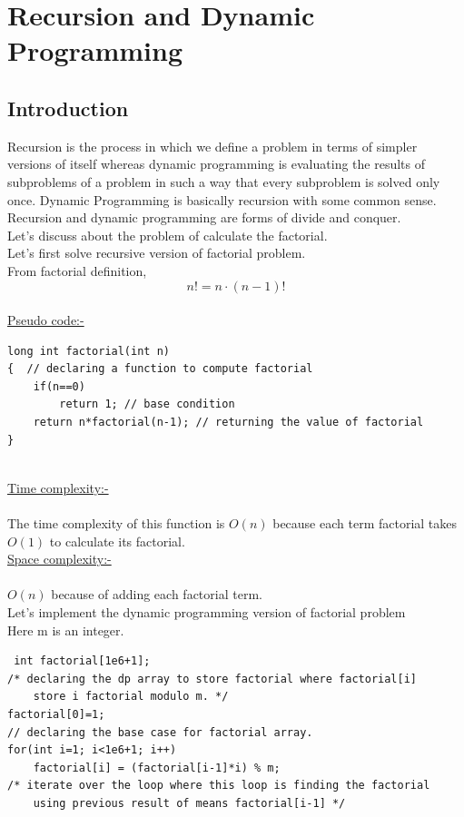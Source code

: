 \documentclass[12pt]{book}
\begin{document}
	\chapter{Recursion and Dynamic Programming}
		\section{Introduction}
			Recursion is the process in which we define a problem in terms of simpler versions of itself whereas dynamic programming is evaluating the results of subproblems of a problem in such a way that every subproblem is solved only once. Dynamic Programming is basically recursion with some common sense. Recursion and dynamic programming are forms of divide and conquer.\\

Let’s discuss about the problem of calculate the  factorial.\\	

Let’s first solve recursive version of factorial problem.\\
           From factorial definition,\\
			 \[n!=n \cdot (n-1)! \]\\
\underline{Pseudo code:-}
\begin{lstlisting}	
long int factorial(int n)
{  // declaring a function to compute factorial
	if(n==0)
		return 1; // base condition
	return n*factorial(n-1); // returning the value of factorial
}
\end{lstlisting}
	
\underline{\\Time complexity:-}\\\\
	The time complexity of this function is $O(n)$ because each term factorial takes $O(1)$ to calculate its factorial.\\

\underline{Space complexity:-}\\\\ $O(n)$ because of adding each factorial term. \\                          

Let’s implement the dynamic programming version of factorial problem \\
Here m is an integer.
\begin{lstlisting}
 int factorial[1e6+1];
/* declaring the dp array to store factorial where factorial[i]
    store i factorial modulo m. */
factorial[0]=1;
// declaring the base case for factorial array.
for(int i=1; i<1e6+1; i++)
	factorial[i] = (factorial[i-1]*i) % m;
/* iterate over the loop where this loop is finding the factorial
    using previous result of means factorial[i-1] */
\end{lstlisting}
\end{document}
